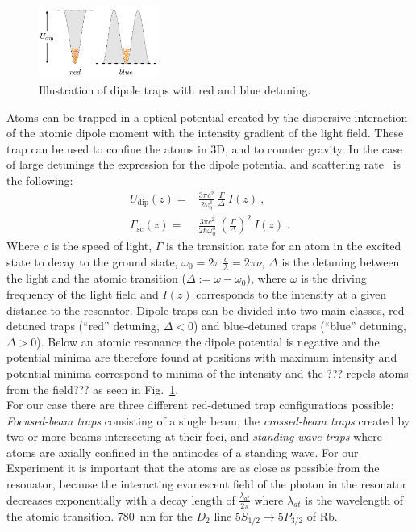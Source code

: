 \begin{figure}
    \centering
    \includegraphics[width=0.35\textwidth]{redbluedetuning}    
    \caption{\label{fig:redbluedetuning} Illustration of dipole traps with red and blue detuning.}
\end{figure}
Atoms can be trapped in a optical potential created by the dispersive interaction of 
the atomic dipole moment with the intensity gradient of the light field. These trap 
can be used to confine the atoms in 3D, and to counter gravity. In the case of large 
detunings the expression for the dipole potential and scattering rate~\cite{grimm} is 
the following:
%
\begin{align} \label{eq:dipolepot_simple}
    U_\mathrm{dip}(z) =& \frac{3\pi c^2}{2\omega_0^3}~\frac{\Gamma}{\Delta}~I(z)~, \\
    \Gamma_{\mathrm{sc}}(z) =& \frac{3\pi c^2}{2\hbar\omega_0^3}~
    {\left ( \frac{\Gamma}{\Delta} \right )}^2~I(z)~.
\end{align}
%
Where \textit{c} is the speed of light, \(\Gamma \) is the transition rate for 
an atom in the excited state to decay to the
ground state, \(\omega_0=2\pi~\frac{c}{\lambda}=2\pi\nu \), \(\Delta \) 
is the detuning between the light and the atomic transition (\(\Delta := \omega - \omega_0 \)), 
where \(\omega \) is the driving frequency of the light field and \(I(z) \) 
corresponds to the intensity at a given distance to the resonator. Dipole traps can 
be divided into two main classes, red-detuned traps (``red'' detuning, \(\Delta < 0 \)) 
and blue-detuned traps (``blue'' detuning, \(\Delta > 0 \)). Below an atomic resonance the dipole potential is
negative and the potential minima are therefore found at positions with maximum 
intensity and potential minima correspond to minima of the intensity and the
??? repels atoms from the field??? as seen in Fig.~\ref{fig:redbluedetuning}.\\

For our case there are three different red-detuned trap configurations possible: 
\textit{Focused-beam traps} consisting of a single beam, the
\textit{crossed-beam traps} created by two or more beams intersecting at their foci,
and \textit{standing-wave traps} where atoms are axially confined in the antinodes
of a standing wave.
For our Experiment it is important that the atoms are as close as possible from the
resonator, because the interacting evanescent field of the photon in the resonator
decreases exponentially with a decay length of \(\frac{\lambda_{at} }{2\pi} \) where 
\(\lambda_{at} \) is the wavelength of the atomic transition. \SI{780}{\nano\meter}
for the \(D_2 \) line \(5S_{1/2} \rightarrow 5P_{3/2} \) of Rb.\\

